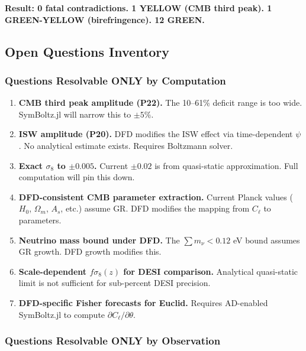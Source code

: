 \documentclass[11pt,a4paper]{article}
\begin{document}
\textbf{Result: 0 fatal contradictions. 1 YELLOW (CMB third peak). 1 GREEN-YELLOW (birefringence). 12 GREEN.}

\subsection{Open Questions Inventory}

\subsubsection{Questions Resolvable ONLY by Computation}

\begin{enumerate}
\item \textbf{CMB third peak amplitude (P22).} The 10--61\% deficit range is too wide. SymBoltz.jl will narrow this to $\pm 5\%$.
\item \textbf{ISW amplitude (P20).} DFD modifies the ISW effect via time-dependent $\psi$. No analytical estimate exists. Requires Boltzmann solver.
\item \textbf{Exact $\sigma_8$ to $\pm 0.005$.} Current $\pm 0.02$ is from quasi-static approximation. Full computation will pin this down.
\item \textbf{DFD-consistent CMB parameter extraction.} Current Planck values ($H_0$, $\Omega_m$, $A_s$, etc.) assume GR. DFD modifies the mapping from $C_\ell$ to parameters.
\item \textbf{Neutrino mass bound under DFD.} The $\sum m_\nu < 0.12$ eV bound assumes GR growth. DFD growth modifies this.
\item \textbf{Scale-dependent $f\sigma_8(z)$ for DESI comparison.} Analytical quasi-static limit is not sufficient for sub-percent DESI precision.
\item \textbf{DFD-specific Fisher forecasts for Euclid.} Requires AD-enabled SymBoltz.jl to compute $\partial C_\ell / \partial \theta$.
\end{enumerate}

\subsubsection{Questions Resolvable ONLY by Observation}
\end{document}

